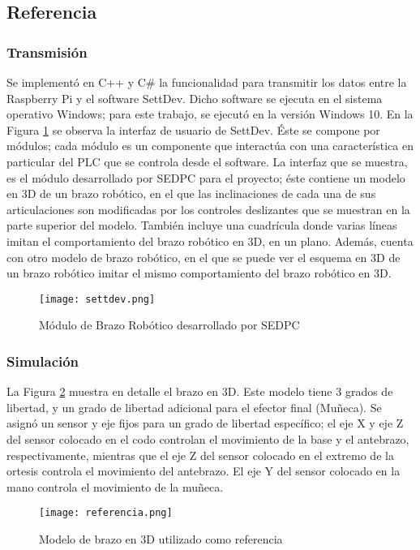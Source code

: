\subsection{Referencia}

\subsubsection{Transmisión}

Se implementó en C++ y C\# la funcionalidad para transmitir los datos entre la Raspberry Pi y el software SettDev. Dicho software se ejecuta en el sistema operativo Windows; para este trabajo, se ejecutó en la versión Windows 10. En la Figura \ref{fig:settdev} se observa la interfaz de usuario de SettDev. Éste se compone por módulos; cada módulo es un componente que interactúa con una característica en particular del PLC que se controla desde el software. La interfaz que se muestra, es el módulo desarrollado por SEDPC para el proyecto; éste contiene un modelo en 3D de un brazo robótico, en el que las inclinaciones de cada una de sus articulaciones son modificadas por los controles deslizantes que se muestran en la parte superior del modelo. También incluye una cuadrícula donde varias líneas imitan el comportamiento del brazo robótico en 3D, en un plano. Además, cuenta con otro modelo de brazo robótico, en el que se puede ver el esquema en 3D de un brazo robótico imitar el mismo comportamiento del brazo robótico en 3D.

\begin{figure}[htb]
	\centering
	\texttt{[image: settdev.png]}
	\caption{Módulo de Brazo Robótico desarrollado por SEDPC}
	\label{fig:settdev}
\end{figure}

\subsubsection{Simulación}

La Figura \ref{fig:referencia} muestra en detalle el brazo en 3D. Este modelo tiene 3 grados de libertad, y un grado de libertad adicional para el efector final (Muñeca). Se asignó un sensor y eje fijos para un grado de libertad específico; el eje X y eje Z del sensor colocado en el codo controlan el movimiento de la base y el antebrazo, respectivamente, mientras que el eje Z del sensor colocado en el extremo de la ortesis controla el movimiento del antebrazo. El eje Y del sensor colocado en la mano controla el movimiento de la muñeca.

\begin{figure}[htb]
	\centering
	\texttt{[image: referencia.png]}
	\caption{Modelo de brazo en 3D utilizado como referencia}
	\label{fig:referencia}
\end{figure}